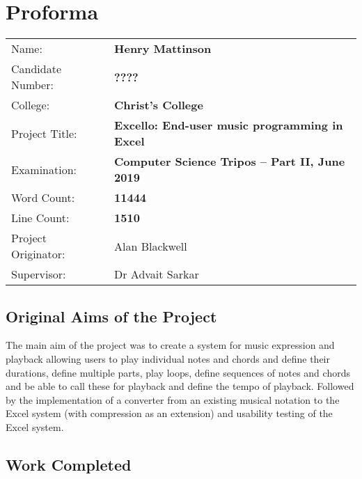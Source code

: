 \chapter*{Proforma}

{\large
\begin{tabular}{ll}
Name:               & \bf Henry Mattinson                      \\
Candidate Number:   & \bf ????                                \\
College:            & \bf Christ's College                     \\
Project Title:      & \bf Excello: End-user music programming in Excel \\
Examination:        & \bf Computer Science Tripos -- Part II, June 2019  \\
Word Count:         & \bf 11444\footnotemark[1]  \\
Line Count:         & \bf 1510\footnotemark[2]  \\
Project Originator: & Alan Blackwell                    \\
Supervisor:         & Dr Advait Sarkar                    \\
\end{tabular}
}


\section*{Original Aims of the Project}

The main aim of the project was to create a system for music expression and playback allowing users to play individual notes and chords and define their durations, define multiple parts, play loops, define sequences of notes and chords and be able to call these for playback and define the tempo of playback. Followed by the implementation of a converter from an existing musical notation to the Excel system (with compression as an extension) and usability testing of the Excel system.

\section*{Work Completed}

